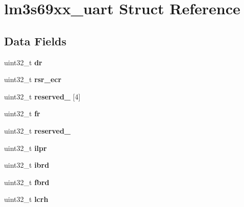 \hypertarget{structlm3s69xx__uart}{}\section{lm3s69xx\+\_\+uart Struct Reference}
\label{structlm3s69xx__uart}
\subsection*{Data Fields}
\begin{DoxyCompactItemize}
\item 
\mbox{\label{structlm3s69xx__uart_a36ee2e173c77e216c2bbed8dcfca154d}} 
uint32\+\_\+t {\bfseries dr}
\item 
\mbox{\label{structlm3s69xx__uart_a2ce061df044a6865e84ca342ce3313ae}} 
uint32\+\_\+t {\bfseries rsr\+\_\+ecr}
\item 
\mbox{\label{structlm3s69xx__uart_a620ed5f3feb05c9eb8e7210b3e3e2bac}} 
uint32\+\_\+t {\bfseries reserved\+\_} \mbox{[}4\mbox{]}
\item 
\mbox{\label{structlm3s69xx__uart_a3ab44f6a26e9649b301fa20dcd5a58be}} 
uint32\+\_\+t {\bfseries fr}
\item 
\mbox{\label{structlm3s69xx__uart_a9c3588ffd44eb92a67b2d6873d937a42}} 
uint32\+\_\+t {\bfseries reserved\+\_}
\item 
\mbox{\label{structlm3s69xx__uart_ac54cda7b7f9220f28e63d893beb27cc2}} 
uint32\+\_\+t {\bfseries ilpr}
\item 
\mbox{\label{structlm3s69xx__uart_a53a886dc66f7eed79531c9d5e9ebe3ad}} 
uint32\+\_\+t {\bfseries ibrd}
\item 
\mbox{\label{structlm3s69xx__uart_ae0dc5721c6c0284f0ad7ca726741c932}} 
uint32\+\_\+t {\bfseries fbrd}
\item 
\mbox{\label{structlm3s69xx__uart_abbb2130c6f3a121be618e63f91db81ac}} 
uint32\+\_\+t {\bfseries lcrh}
\item 

\end{DoxyCompactItemize}
